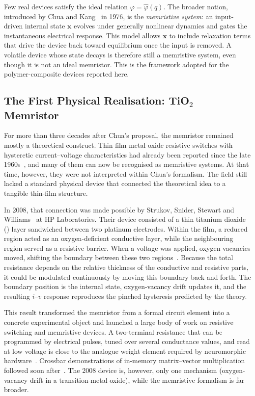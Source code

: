 \documentclass[12pt, twoside]{report}
\begin{document}
Few real devices satisfy the ideal relation \(\varphi = \hat{\varphi}(q)\). The broader notion, introduced by Chua and Kang~\cite{ChuaKang1976} in 1976, is the \textit{memristive system}: an input-driven internal state \(\mathbf{x}\) evolves under generally nonlinear dynamics and gates the instantaneous electrical response. This model allows \(\mathbf{x}\) to include relaxation terms that drive the device back toward equilibrium once the input is removed. A volatile device whose state decays is therefore still a memristive system, even though it is not an ideal memristor. This is the framework adopted for the polymer-composite devices reported here.

\subsection{The First Physical Realisation: TiO\texorpdfstring{$_2$}{2} Memristor}\label{subsec:tio2_memristor}

For more than three decades after Chua's proposal, the memristor remained mostly a theoretical construct. Thin-film metal-oxide resistive switches with hysteretic current--voltage characteristics had already been reported since the late 1960s~\cite{Hickmott1962, Argall1968, Dearnaley1970}, and many of them can now be recognised as memristive systems. At that time, however, they were not interpreted within Chua's formalism. The field still lacked a standard physical device that connected the theoretical idea to a tangible thin-film structure.

In 2008, that connection was made possible by Strukov, Snider, Stewart and Williams~\cite{Strukov2008} at HP Laboratories. Their device consisted of a thin titanium dioxide () layer sandwiched between two platinum electrodes. Within the film, a reduced  region acted as an oxygen-deficient conductive layer, while the neighbouring  region served as a resistive barrier. When a voltage was applied, oxygen vacancies moved, shifting the boundary between these two regions~\cite{Yang2008}. Because the total resistance depends on the relative thickness of the conductive and resistive parts, it could be modulated continuously by moving this boundary back and forth. The boundary position is the internal state, oxygen-vacancy drift updates it, and the resulting \(i\)--\(v\) response reproduces the pinched hysteresis predicted by the theory.

This result transformed the memristor from a formal circuit element into a concrete experimental object and launched a large body of work on resistive switching and memristive devices. A two-terminal resistance that can be programmed by electrical pulses, tuned over several conductance values, and read at low voltage is close to the analogue weight element required by neuromorphic hardware~\cite{YangStrukovStewart2013}. Crossbar demonstrations of in-memory matrix--vector multiplication followed soon after~\cite{Prezioso2015, IelminiWong2018}. The 2008  device is, however, only one mechanism (oxygen-vacancy drift in a transition-metal oxide), while the memristive formalism is far broader.
\end{document}
